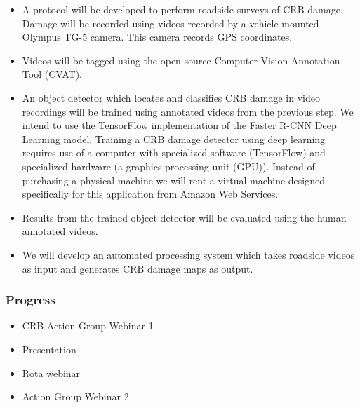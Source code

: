 \documentclass[12pt,letterpaper,english,bibliography=totocnumbered,abstract=on]{scrartcl}
\begin{document}
\begin{framed}
\begin{itemize}
	\item A protocol will be developed to perform roadside surveys of CRB damage. Damage will be recorded using videos recorded by a vehicle-mounted Olympus TG-5 camera. This camera records GPS coordinates.
	\item Videos will be tagged using the open source Computer Vision Annotation Tool (CVAT).
	\item An object detector which locates and classifies CRB damage in video recordings will be trained using annotated videos from the previous step. We intend to use the TensorFlow implementation of the Faster R-CNN Deep Learning model. Training a CRB damage detector using deep learning requires use of a computer with specialized software (TensorFlow) and specialized hardware (a graphics processing unit (GPU)). Instead of purchasing a physical machine we will rent a virtual machine designed specifically for this application from Amazon Web Services.
	\item Results from the trained object detector will be evaluated using the human annotated videos.
	\item We will develop an automated processing system which takes roadside videos as input and generates CRB damage maps as output.
\end{itemize}
\end{framed}

\subsubsection{Progress}

\begin{itemize}
	\item CRB Action Group Webinar 1
	\item Presentation
	\item Rota webinar \cite{mooreCRBBiologyKnow2021}
	\item Action Group Webinar 2
\end{itemize}

\newpage
\end{document}

